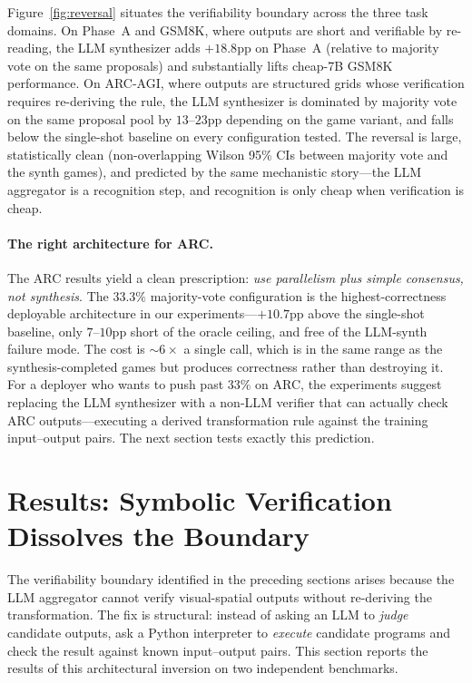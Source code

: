 \documentclass[11pt]{amsart}
\newcommand\1{{\mathds{1}}}
\theoremstyle{definition}
\theoremstyle{remark}
\numberwithin{equation}{section}
\begin{document}
Figure~\ref{fig:reversal} situates the verifiability boundary across the three task domains.
On Phase~A and GSM8K, where outputs are short and verifiable by re-reading, the LLM synthesizer adds $+18.8$pp on Phase~A (relative to majority vote on the same proposals) and substantially lifts cheap-7B GSM8K performance.
On ARC-AGI, where outputs are structured grids whose verification requires re-deriving the rule, the LLM synthesizer is dominated by majority vote on the same proposal pool by $13$--$23$pp depending on the game variant, and falls below the single-shot baseline on every configuration tested.
The reversal is large, statistically clean (non-overlapping Wilson 95\% CIs between majority vote and the synth games), and predicted by the same mechanistic story---the LLM aggregator is a recognition step, and recognition is only cheap when verification is cheap.

\paragraph{The right architecture for ARC.}
The ARC results yield a clean prescription: \emph{use parallelism plus simple consensus, not synthesis}.
The $33.3\%$ majority-vote configuration is the highest-correctness deployable architecture in our experiments---$+10.7$pp above the single-shot baseline, only $7$--$10$pp short of the oracle ceiling, and free of the LLM-synth failure mode.
The cost is $\sim 6\times$ a single call, which is in the same range as the synthesis-completed games but produces correctness rather than destroying it.
For a deployer who wants to push past $33\%$ on ARC, the experiments suggest replacing the LLM synthesizer with a non-LLM verifier that can actually check ARC outputs---executing a derived transformation rule against the training input--output pairs.
The next section tests exactly this prediction.

\section{Results: Symbolic Verification Dissolves the Boundary}\label{sec:act2}

The verifiability boundary identified in the preceding sections arises because the LLM aggregator cannot verify visual-spatial outputs without re-deriving the transformation.
The fix is structural: instead of asking an LLM to \emph{judge} candidate outputs, ask a Python interpreter to \emph{execute} candidate programs and check the result against known input--output pairs.
This section reports the results of this architectural inversion on two independent benchmarks.
\end{document}
